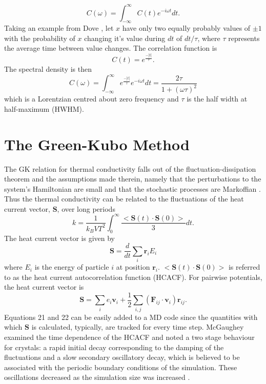 \documentclass[aps,prb,preprint,preprintnumbers,amsmath,amssymb,floatfix,superscriptaddress]{revtex4}
\begin{document}
%
\begin{equation}
C(\omega)=\int_{-\infty}^{\infty}C(t)e^{-i\omega t}dt.
\end{equation}
%
Taking an example from Dove \cite{dove}, let $x$ have only two equally probably values of $\pm 1$ with the probability of $x$ changing it's value during $dt$ of $dt/\tau$, where $\tau$ represents the average time between value changes. The correlation function is
%
\begin{equation}
C(t)=e^{\frac{-|t|}{\tau}}.
\end{equation}
%
The spectral density is then
\begin{equation}
C(\omega)=\int_{-\infty}^{\infty}e^{\frac{-|t|}{\tau}}e^{-i\omega t}dt=\frac{2\tau}{1+(\omega \tau )^2}
\end{equation}
which is a Lorentzian centred about zero frequency and $\tau$ is the half width at half-maximum (HWHM).
\section*{The Green-Kubo Method}

The GK relation for thermal conductivity falls out of the fluctuation-dissipation theorem and the assumptions made therein, namely that the perturbations to the system's Hamiltonian are small and that the stochastic processes are Markoffian \cite{green:398}. Thus the thermal conductivity can be related to the fluctuations of the heat current vector, $\pmb{S}$, over long periods
%
\begin{equation}
k=\frac{1}{k_B V T^2}\int_0^{\infty}\frac{<\pmb{S}(t)\cdot\pmb{S}(0)>}{3}dt.
\end{equation}
%
The heat current vector is given by 
%
\begin{equation}
\pmb{S}=\frac{d}{dt}\sum_i\pmb{r}_iE_i
\end{equation}
%
where $E_i$ is the energy of particle $i$ at position $\pmb{r}_i$. $<\pmb{S}(t)\cdot\pmb{S}(0)>$ is referred to as the heat current autocorrelation function (HCACF). For pairwise potentials, the heat current vector is
%
\begin{equation}
\pmb{S}=\sum_ie_i\pmb{v}_i+\frac{1}{2}\sum_{i,j}(\pmb{F}_{ij}\cdot\pmb{v}_{i})\pmb{r}_{ij}.
\end{equation}
%
Equations 21 and 22 can be easily added to a MD code since the quantities with which $\pmb{S}$ is calculated, typically, are tracked for every time step. McGaughey examined the time dependence of the HCACF and noted a two stage behaviour for crystals: a rapid initial decay corresponding to the damping of the fluctuations and a slow secondary oscillatory decay, which is believed to be associated with the periodic boundary conditions of the simulation. These oscillations decreased as the simulation size was increased \cite{mcgaugheythesis}.
\end{document}
